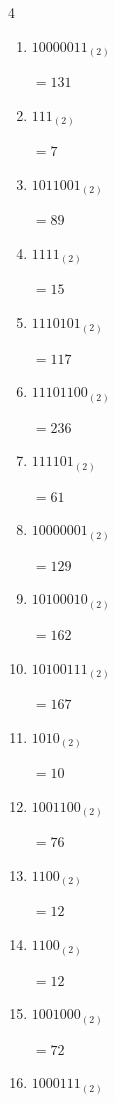 \begin{multicols}{4}
\begin{enumerate}
        $=109$

  \item $10000011_{(2)}$

        $=131$

  \item $111_{(2)}$

        $=7$

  \item $1011001_{(2)}$

        $=89$

  \item $1111_{(2)}$

        $=15$

  \item $1110101_{(2)}$

        $=117$

  \item $11101100_{(2)}$

        $=236$

  \item $111101_{(2)}$

        $=61$

  \item $10000001_{(2)}$

        $=129$

  \item $10100010_{(2)}$

        $=162$

  \item $10100111_{(2)}$

        $=167$

  \item $1010_{(2)}$

        $=10$

\columnbreak %

  \item $1001100_{(2)}$

        $=76$

  \item $1100_{(2)}$

        $=12$

  \item $1100_{(2)}$

        $=12$

  \item $1001000_{(2)}$

        $=72$

  \item $1000111_{(2)}$


\end{enumerate}
\end{multicols}
